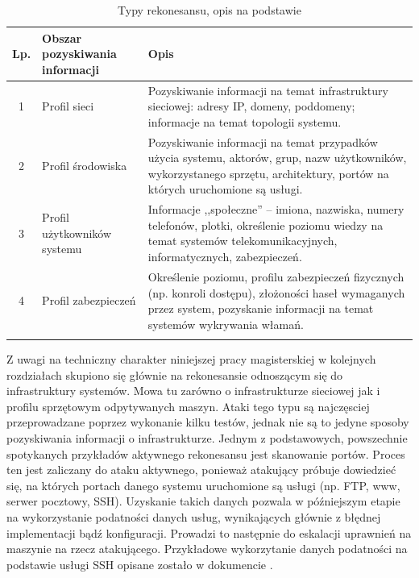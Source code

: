 \begin{longtable}{|c|p{4cm}|p{8cm}|}

	\hline
	\textbf{Lp.} &
	\textbf{Obszar pozyskiwania informacji} &
	\textbf{Opis} \\ \hline\hline
	1 & Profil sieci &
	Pozyskiwanie informacji na temat infrastruktury sieciowej: adresy IP, domeny, poddomeny; informacje na temat topologii
	systemu.\\
	\hline
  	2 & Profil środowiska &
	Pozyskiwanie informacji na temat przypadków użycia systemu, aktorów, grup, nazw użytkowników, wykorzystanego sprzętu, architektury,
	portów na których uruchomione są usługi.
  	\\
	\hline
	3 & Profil użytkowników systemu &
	Informacje ,,społeczne'' -- imiona, nazwiska, numery telefonów, plotki, określenie poziomu wiedzy na temat systemów
	telekomunikacyjnych, informatycznych, zabezpieczeń.
	\\
	\hline
	4 & Profil zabezpieczeń &
	Określenie poziomu, profilu zabezpieczeń fizycznych (np. konroli dostępu), złożoności haseł wymaganych przez system, pozyskanie
	informacji na temat systemów wykrywania włamań.\\
	\hline
	\caption{Typy rekonesansu, opis na podstawie \cite{rekonesans}}
	\label{tab:rekonesans}
\end{longtable}

Z uwagi na techniczny charakter niniejszej pracy magisterskiej w kolejnych rozdziałach skupiono się głównie na rekonesansie odnoszącym
się do infrastruktury systemów. Mowa tu zarówno o infrastrukturze sieciowej jak i profilu sprzętowym odpytywanych maszyn. Ataki tego typu
są najczęsciej przeprowadzane poprzez wykonanie kilku testów, jednak nie są to jedyne sposoby pozyskiwania informacji o infrastrukturze.
Jednym z podstawowych, powszechnie spotykanych przykładów aktywnego rekonesansu jest skanowanie portów. Proces ten jest zaliczany
do ataku aktywnego, ponieważ atakujący próbuje dowiedzieć się, na których portach danego systemu uruchomione są usługi (np. FTP, www,
serwer pocztowy, SSH). Uzyskanie takich danych pozwala w późniejszym etapie na wykorzystanie podatności danych usług, wynikających
głównie z błędnej implementacji bądź konfiguracji. Prowadzi to następnie do eskalacji uprawnień na maszynie na rzecz atakującego.
Przykładowe wykorzytanie danych podatności na podstawie usługi SSH opisane zostało w dokumencie \cite{ssh_podatnosci}.

